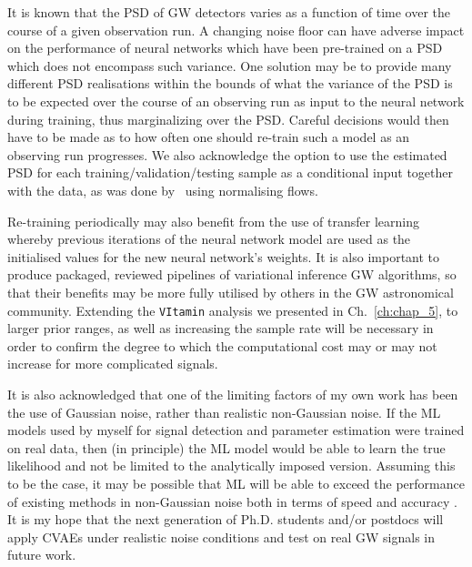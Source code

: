 %
%
It is known that the \ac{PSD} of \ac{GW} detectors varies as a function of 
time over the course of a given observation run. A changing noise floor 
can have adverse impact on the performance of neural networks 
which have been pre-trained on a \ac{PSD} which does not encompass 
such variance. One solution may be to provide many different 
\ac{PSD} realisations within the bounds of what the variance of 
the \ac{PSD} is to be expected over the course of an observing run as 
input to the neural network during training, thus marginalizing 
over the \ac{PSD}. Careful decisions would then have to be 
made as to how often one should re-train such a model as an 
observing run progresses. We also acknowledge the option 
to use the estimated \ac{PSD} for each training/validation/testing 
sample as a conditional input together with the data, as was done 
by~\cite{2021arXiv210612594D} using normalising flows. 

Re-training periodically may also 
benefit from the use of transfer learning~\cite{Goodfellow-et-al-2016} 
whereby previous iterations of the neural network model are used 
as the initialised values for the new neural network's weights. It 
is also important to produce packaged, reviewed pipelines of 
variational inference \ac{GW} algorithms, so that their benefits 
may be more fully utilised by others in the \ac{GW} astronomical 
community. Extending the \texttt{VItamin} analysis we 
presented in Ch.~\ref{ch:chap_5}, to larger prior ranges, as well as 
increasing the sample rate will be necessary in order to confirm 
the degree to which the computational cost may or may not increase 
for more complicated signals.

%
%
It is also acknowledged that one of the 
limiting factors of my own work has been the use of Gaussian noise, rather 
than realistic non-Gaussian noise. If the \ac{ML} models used by myself for 
signal detection and parameter estimation were trained on real data, 
then (in principle) the \ac{ML} model would be able to learn the true likelihood 
and not be limited to the analytically imposed version. Assuming this to 
be the case, it may be possible that \ac{ML} will be able to 
exceed the performance of existing methods in non-Gaussian noise 
both in terms of speed and accuracy .
It is my hope that the next generation 
of Ph.D. students and/or postdocs will apply \acp{CVAE} under realistic 
noise conditions and test on real \ac{GW} signals in  
future work.

